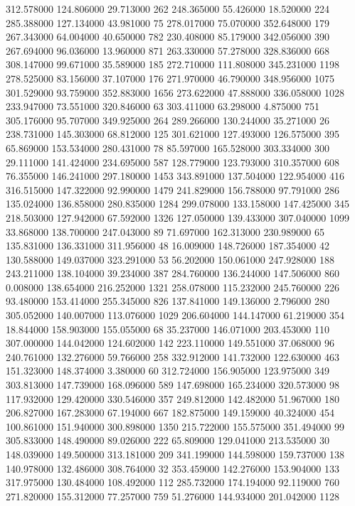 312.578000	124.806000	29.713000	262
248.365000	55.426000	18.520000	224
285.388000	127.134000	43.981000	75
278.017000	75.070000	352.648000	179
267.343000	64.004000	40.650000	782
230.408000	85.179000	342.056000	390
267.694000	96.036000	13.960000	871
263.330000	57.278000	328.836000	668
308.147000	99.671000	35.589000	185
272.710000	111.808000	345.231000	1198
278.525000	83.156000	37.107000	176
271.970000	46.790000	348.956000	1075
301.529000	93.759000	352.883000	1656
273.622000	47.888000	336.058000	1028
233.947000	73.551000	320.846000	63
303.411000	63.298000	4.875000	751
305.176000	95.707000	349.925000	264
289.266000	130.244000	35.271000	26
238.731000	145.303000	68.812000	125
301.621000	127.493000	126.575000	395
65.869000	153.534000	280.431000	78
85.597000	165.528000	303.334000	300
29.111000	141.424000	234.695000	587
128.779000	123.793000	310.357000	608
76.355000	146.241000	297.180000	1453
343.891000	137.504000	122.954000	416
316.515000	147.322000	92.990000	1479
241.829000	156.788000	97.791000	286
135.024000	136.858000	280.835000	1284
299.078000	133.158000	147.425000	345
218.503000	127.942000	67.592000	1326
127.050000	139.433000	307.040000	1099
33.868000	138.700000	247.043000	89
71.697000	162.313000	230.989000	65
135.831000	136.331000	311.956000	48
16.009000	148.726000	187.354000	42
130.588000	149.037000	323.291000	53
56.202000	150.061000	247.928000	188
243.211000	138.104000	39.234000	387
284.760000	136.244000	147.506000	860
0.008000	138.654000	216.252000	1321
258.078000	115.232000	245.760000	226
93.480000	153.414000	255.345000	826
137.841000	149.136000	2.796000	280
305.052000	140.007000	113.076000	1029
206.604000	144.147000	61.219000	354
18.844000	158.903000	155.055000	68
35.237000	146.071000	203.453000	110
307.000000	144.042000	124.602000	142
223.110000	149.551000	37.068000	96
240.761000	132.276000	59.766000	258
332.912000	141.732000	122.630000	463
151.323000	148.374000	3.380000	60
312.724000	156.905000	123.975000	349
303.813000	147.739000	168.096000	589
147.698000	165.234000	320.573000	98
117.932000	129.420000	330.546000	357
249.812000	142.482000	51.967000	180
206.827000	167.283000	67.194000	667
182.875000	149.159000	40.324000	454
100.861000	151.940000	300.898000	1350
215.722000	155.575000	351.494000	99
305.833000	148.490000	89.026000	222
65.809000	129.041000	213.535000	30
148.039000	149.500000	313.181000	209
341.199000	144.598000	159.737000	138
140.978000	132.486000	308.764000	32
353.459000	142.276000	153.904000	133
317.975000	130.484000	108.492000	112
285.732000	174.194000	92.119000	760
271.820000	155.312000	77.257000	759
51.276000	144.934000	201.042000	1128

